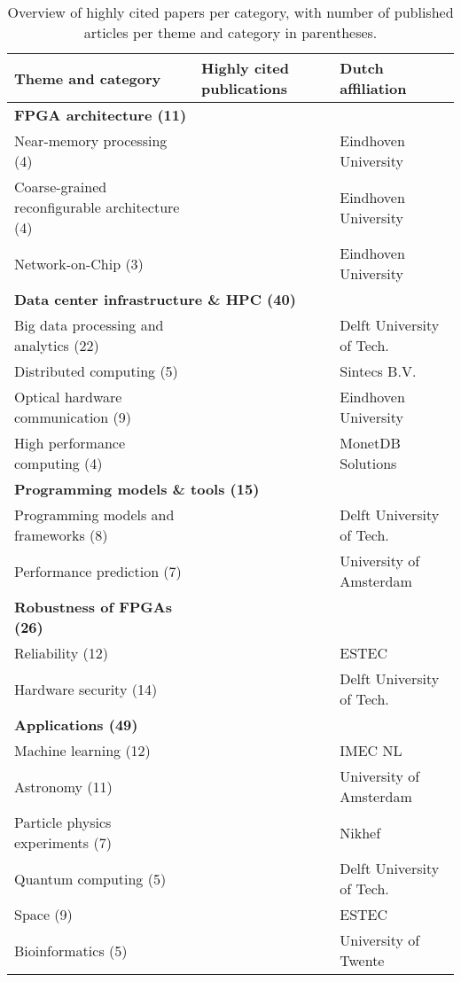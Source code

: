\begin{table}[!ht]
\centering
\caption{Overview of highly cited papers per category, with number of published articles per theme and category in parentheses.}
\label{tab:overview-themes-most-cited}
{\small
\begin{tabular}{lll}
\textbf{Theme and category} & \textbf{Highly cited publications} & \textbf{Dutch affiliation} \\ \hline
\textbf{\textbf{FPGA architecture (11)}} &  &  \\ \cline{1-1}
Near-memory processing (4) & \citet{Singh2021FPGA-BasedApplications} & Eindhoven University \\
Coarse-grained reconfigurable architecture (4) & \citet{Wijtvliet2019Blocks:Efficiency} & Eindhoven University \\
Network-on-Chip (3) & \citet{RibotGonzalez2020HopliteRT:FPGA} & Eindhoven University \\ \hline
\multicolumn{2}{l}{\textbf{\textbf{Data center infrastructure \& HPC (40)}}}  &  \\ \cline{1-1}
Big data processing and analytics (22) & \citet{Peltenburg2019Fletcher:Arrow} & Delft University of Tech. \\
Distributed computing (5) & \citet{Bielski2018DReDBox:Datacenter} & Sintecs B.V. \\
Optical hardware communication (9) & \citet{Yan2018HiFOST:Switches} & Eindhoven University \\
High performance computing (4) & \citet{Katevenis2018NextDevelopment} & MonetDB Solutions \\ \hline
\multicolumn{2}{l}{\textbf{\textbf{Programming models \& tools (15)}} }  &  \\ \cline{1-1}
Programming models and frameworks (8) & \citet{Peltenburg2020Tydi:Streams} & Delft University of Tech.  \\
Performance prediction (7) & \citet{Yasudo2018PerformancePlatforms} & University of Amsterdam \\ \hline
\textbf{\textbf{Robustness of FPGAs (26)}} &  &  \\ \cline{1-1}
Reliability (12) & \citet{Du2019UltrahighFPGA} & ESTEC \\
Hardware security (14) & \citet{Labafniya2020OnPrevention} & Delft University of Tech. \\ \hline
\textbf{\textbf{Applications (49)}} &  &  \\ \cline{1-1}
Machine learning (12) & \citet{Rocha2020BinaryWrist-PPG} & IMEC NL \\
Astronomy (11) & \citet{Ashton2020ATelescopes} & University of Amsterdam \\
Particle physics experiments (7) & \citet{FernandezPrieto2020PhaseExperiment} & Nikhef \\
Quantum computing (5) & \citet{Philips-nat-2022} & Delft University of Tech. \\
Space (9) & \citet{Barrios2020SHyLoCMissions} & ESTEC \\
Bioinformatics (5) & \citet{Malakonakis2020ExploringRAxML} & University of Twente \\ \hline
\end{tabular}
}
\end{table}


